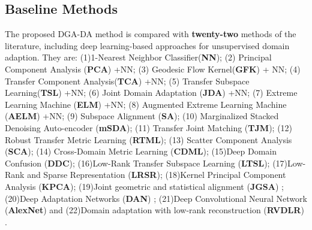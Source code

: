 \documentclass[journal,twocolumn]{IEEEtran}
\begin{document}
\begin{CJK*}{UTF8}{gkai}
\subsection{Baseline Methods}
\label{subsection:Baseline Methods}
The proposed DGA-DA method is compared with \textbf{twenty-two} methods of the literature, including deep learning-based approaches for unsupervised domain adaption. They are: 
(1)1-Nearest Neighbor Classifier(\textbf{NN}); 
(2) Principal Component Analysis (\textbf{PCA}) +NN; 
(3) Geodesic Flow Kernel(\textbf{GFK}) \cite{gong2012geodesic} + NN; 
(4) Transfer Component Analysis(\textbf{TCA}) \cite{pan2011domain} +NN; 
(5) Transfer Subspace Learning(\textbf{TSL}) \cite{4967588} +NN; 
(6) Joint Domain Adaptation (\textbf{JDA}) \cite{long2013transfer} +NN; 
(7) Extreme Learning Machine (\textbf{ELM}) \cite{DBLP:journals/tcyb/UzairM17} +NN; 
(8) Augmented Extreme Learning Machine (\textbf{AELM}) \cite{DBLP:journals/tcyb/UzairM17} +NN; 
(9) Subspace Alignment (\textbf{SA})\cite{DBLP:conf/iccv/FernandoHST13}; 
(10) Marginalized Stacked Denoising Auto-encoder (\textbf{mSDA})\cite{DBLP:journals/corr/abs-1206-4683}; 
(11) Transfer Joint Matching (\textbf{TJM})\cite{DBLP:conf/cvpr/LongWDSY14}; 
(12) Robust Transfer Metric Learning (\textbf{RTML})\cite{DBLP:journals/tip/DingF17}; 
(13) Scatter Component Analysis (\textbf{SCA})\cite{DBLP:journals/pami/GhifaryBKZ17}; 
(14) Cross-Domain Metric Learning (\textbf{CDML})\cite{DBLP:conf/aaai/WangWZX14}; 
(15)Deep Domain Confusion (\textbf{DDC})\cite{DBLP:journals/corr/TzengHZSD14}; 
(16)Low-Rank Transfer Subspace Learning (\textbf{LTSL})\cite{DBLP:journals/ijcv/ShaoKF14}; 
(17)Low-Rank and Sparse Representation (\textbf{LRSR})\cite{DBLP:journals/tip/XuFWLZ16}; 
(18)Kernel Principal Component Analysis (\textbf{KPCA})\cite{DBLP:journals/neco/ScholkopfSM98}; 
(19)Joint geometric and statistical alignment (\textbf{JGSA}) \cite{Zhang_2017_CVPR}; 
(20)Deep Adaptation Networks (\textbf{DAN}) \cite{long2015learning};
(21)Deep Convolutional Neural Network (\textbf{AlexNet}) \cite{krizhevsky2012imagenet}
% 
% 
and
(22)Domain adaptation with low-rank reconstruction (\textbf{RVDLR}) \cite{jhuo2012robust}.


\end{CJK*}
\end{document}
